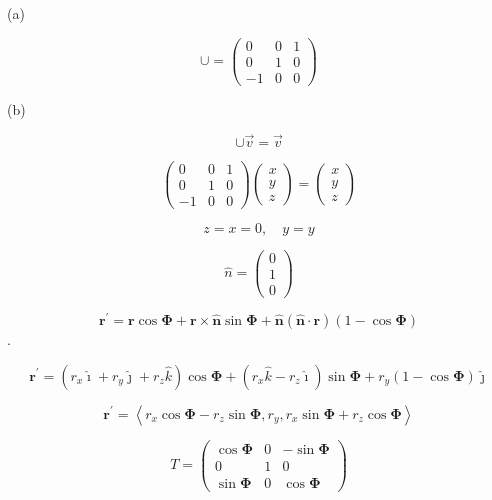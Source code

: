 \documentclass[12pt]{article}
\begin{document}
(a)

\[
    \cup = \begin{pmatrix}
        0  & 0 & 1 \\
        0  & 1 & 0 \\
        -1 & 0 & 0
    \end{pmatrix}
\]

(b)

\[
    \cup \vec{v} = \vec{v}
\]

\[
    \begin{pmatrix}
        0  & 0 & 1 \\
        0  & 1 & 0 \\
        -1 & 0 & 0
    \end{pmatrix}
    \begin{pmatrix}
        x \\
        y \\
        z
    \end{pmatrix}
    =
    \begin{pmatrix}
        x \\
        y \\
        z
    \end{pmatrix}
\]

\[
    z = x = 0, \quad y = y
\]

\[
    \hat{n} = \begin{pmatrix}
        0 \\
        1 \\
        0
    \end{pmatrix}
\]

\[
    \mathbf{r}^{\prime}=\mathbf{r} \cos \boldsymbol{\Phi}+\mathbf{r} \times \hat{\mathbf{n}} \sin \boldsymbol{\Phi}+\hat{\mathbf{n}}(\hat{\mathbf{n}} \cdot \mathbf{r})(1-\cos \boldsymbol{\Phi})
\].


\[
    \mathbf{r}^{\prime}=(r_x\hat{\imath} + r_y\hat{\jmath} + r_z\hat{k}) \cos \boldsymbol{\Phi}+(r_x\hat{k}-r_z\hat{\imath}) \sin \boldsymbol{\Phi}+r_y(1-\cos \boldsymbol{\Phi})\hat{\jmath}
\]

\[
    \mathbf{r}^{\prime}=
    \left\langle r_x\cos \boldsymbol{\Phi} - r_z\sin \boldsymbol{\Phi}
    , r_y
    , r_x\sin \boldsymbol{\Phi} + r_z\cos \boldsymbol{\Phi}\right\rangle
\]

\[
    T = \begin{pmatrix}
        \cos \boldsymbol{\Phi} & 0 & - \sin \boldsymbol{\Phi} \\
        0                      & 1 & 0                        \\
        \sin \boldsymbol{\Phi} & 0 & \cos \boldsymbol{\Phi}
    \end{pmatrix}
\]
\end{document}
